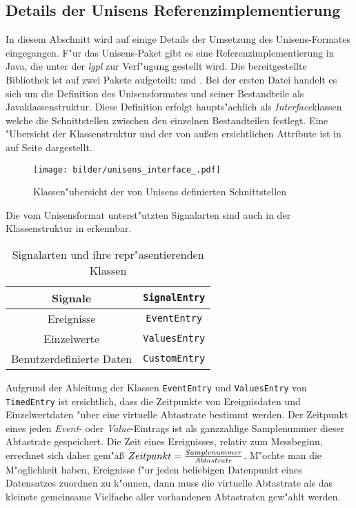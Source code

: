 \subsection{Details der Unisens Referenzimplementierung}

In diesem Abschnitt wird auf einige Details der Umsetzung des Unisens-Formates eingegangen.
F"ur das Unisens-Paket gibt es eine Referenzimplementierung in Java, die unter der \emph{\ac{lgpl}} zur Verf"ugung gestellt wird.
Die bereitgestellte Bibliothek ist auf zwei Pakete aufgeteilt:  und .
Bei der ersten Datei handelt es sich um die Definition des Unisensformates und seiner Bestandteile als Javaklassenstruktur.
Diese Definition erfolgt haupts"achlich als \emph{Interface}klassen welche die Schnittstellen zwischen den einzelnen Bestandteilen festlegt.
Eine "Ubersicht der Klassenstruktur und der von au{\ss}en ersichtlichen Attribute ist in  auf Seite \pageref{pic:unisens_interface} dargestellt.
\begin{sidewaysfigure}%
\centering
\texttt{[image: bilder/unisens\_interface\_.pdf]}
\caption{Klassen"ubersicht der von Unisens definierten Schnittstellen}
\label{pic:unisens_interface}
\end{sidewaysfigure}
Die vom Unisensformat unterst"utzten Signalarten sind auch in der Klassenstruktur in  erkennbar.
\begin{table}[h]
\centering
\caption{Signalarten und ihre repr"asentierenden Klassen}
\label{tab:unisens_signalklassen}
\begin{tabular}{|c|c|}
	\hline Signale & \verb|SignalEntry| \\
	\hline Ereignisse & \verb|EventEntry| \\
	\hline Einzelwerte & \verb|ValuesEntry| \\
	\hline Benutzerdefinierte Daten & \verb|CustomEntry| \\
	\hline
\end{tabular}
\end{table}

Aufgrund der Ableitung der Klassen \verb|EventEntry| und \verb|ValuesEntry| von \verb|TimedEntry| ist ersichtlich, dass die Zeitpunkte von Ereignisdaten und Einzelwertdaten "uber eine virtuelle Abtastrate bestimmt werden.
Der Zeitpunkt eines jeden \emph{Event}- oder \emph{Value}-Eintrags ist als ganzzahlige Samplenummer dieser Abtastrate gespeichert.
Die Zeit eines Ereignisses, relativ zum Messbeginn, errechnet sich daher gem"a{\ss} $Zeitpunkt = {Samplenummer \over Abtastrate}$.
M"ochte man die M"oglichkeit haben, Ereignisse f"ur jeden beliebigen Datenpunkt eines Datensatzes zuordnen zu k"onnen, dann muss die virtuelle Abtastrate als das kleinste gemeinsame Vielfache aller vorhandenen Abtastraten gew"ahlt werden.

